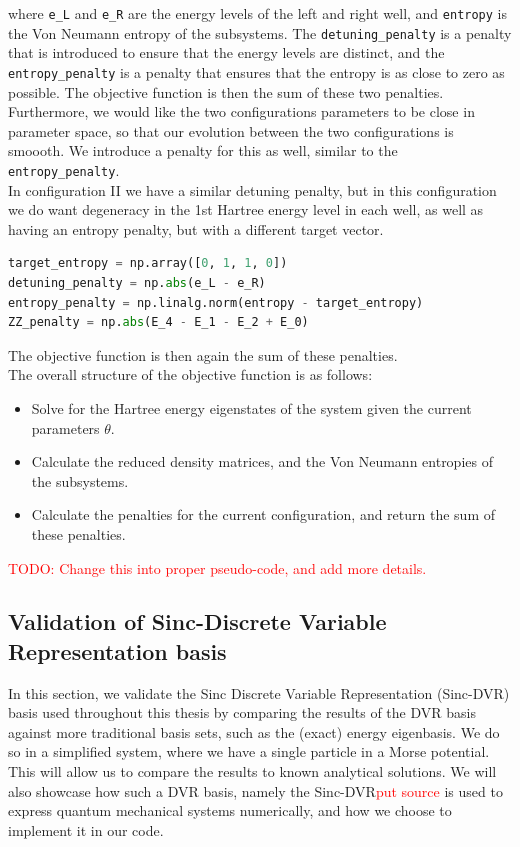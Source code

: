 \documentclass{subfiles}
\begin{document}
where \texttt{e\_L} and \texttt{e\_R} are the energy levels of the left and right well, and \texttt{entropy} is the Von Neumann entropy of the subsystems. The \texttt{detuning\_penalty} is a penalty that is introduced to ensure that the energy levels are distinct, and the \texttt{entropy\_penalty} is a penalty that ensures that the entropy is as close to zero as possible. The objective function is then the sum of these two penalties. Furthermore, we would like the two configurations parameters to be close in parameter space, so that our evolution between the two configurations is smoooth. We introduce a penalty for this as well, similar to the \texttt{entropy\_penalty}.
\\ In configuration II we have a similar detuning penalty, but in this configuration we do want degeneracy in the 1st Hartree energy level in each well, as well as having an entropy penalty, but with a different target vector. 
\begin{lstlisting}[language=Python]
target_entropy = np.array([0, 1, 1, 0])
detuning_penalty = np.abs(e_L - e_R)
entropy_penalty = np.linalg.norm(entropy - target_entropy)
ZZ_penalty = np.abs(E_4 - E_1 - E_2 + E_0)
\end{lstlisting}
The objective function is then again the sum of these penalties. \\ 
The overall structure of the objective function is as follows:
\begin{itemize}
    \item Solve for the Hartree energy eigenstates of the system given the current parameters $\theta$.
    \item Calculate the reduced density matrices, and the Von Neumann entropies of the subsystems.
    \item Calculate the penalties for the current configuration, and return the sum of these penalties.
\end{itemize}
\textcolor{red}{TODO: Change this into proper pseudo-code, and add more details.}


\subsection{Validation of Sinc-Discrete Variable Representation basis}\label{sec:sinc_dvr_validation}
In this section, we validate the Sinc Discrete Variable Representation (Sinc-DVR) basis used throughout this thesis by comparing the results of the DVR basis against more traditional basis sets, such as the (exact) energy eigenbasis. We do so in a simplified system, where we have a single particle in a Morse potential. This will allow us to compare the results to known analytical solutions. We will also showcase how such a DVR basis, namely the Sinc-DVR\textcolor{red}{put source} is used to express quantum mechanical systems numerically, and how we choose to implement it in our code. 
\end{document}
